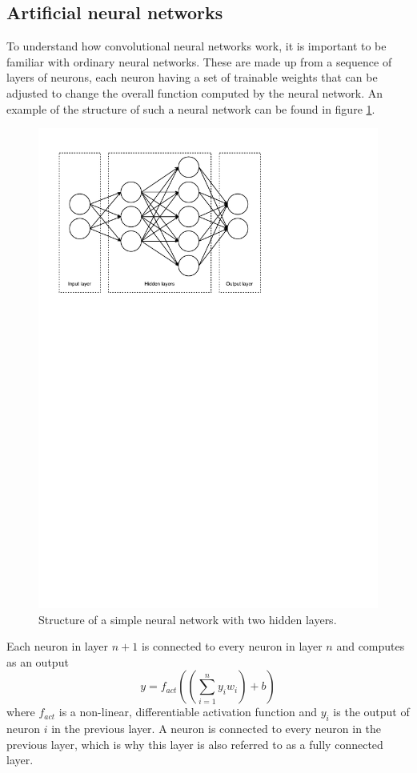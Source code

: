 \documentclass[12pt,a4paper,twoside,openright]{report}
\begin{document}
\subsection{Artificial neural networks}
To understand how convolutional neural networks work, it is important to be familiar with ordinary neural networks. These are made up from a sequence of layers of neurons, each neuron having a set of trainable weights that can be adjusted to change the overall function computed by the neural network. An example of the structure of such a neural network can be found in figure \ref{fig:nn_layout}.
\begin{figure}
	\centering
	\includegraphics[scale=0.6]{nn_layout}
	\caption{Structure of a simple neural network with two hidden layers.}
	\label{fig:nn_layout}
\end{figure}

Each neuron in layer $n+1$ is connected to every neuron in layer $n$ and computes as an output
\[y = f_{act}((\sum_{i=1}^{n} y_i w_i) + b)\]
where $f_{act}$ is a non-linear, differentiable activation function and $y_i$ is the output of neuron $i$ in the previous layer. A neuron is connected to every neuron in the previous layer, which is why this layer is also referred to as a fully connected layer.
\end{document}

